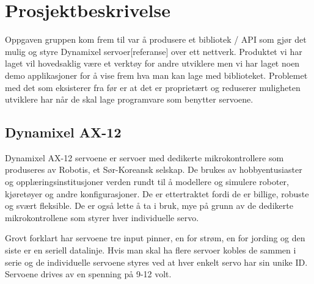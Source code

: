 \documentclass[12pt]{report}
\begin{document}
\section{Prosjektbeskrivelse}
Oppgaven gruppen kom frem til var å produsere et bibliotek / API som gjør det mulig og styre Dynamixel servoer[referanse] over ett nettverk. Produktet vi har laget vil hovedsaklig være et verktøy for andre utviklere men vi har laget noen demo applikasjoner for å vise frem hva man kan lage med biblioteket. Problemet med det som eksisterer fra før er at det er proprietært og reduserer muligheten utviklere har når de skal lage programvare som benytter servoene.

\subsection{Dynamixel AX-12}
Dynamixel AX-12 servoene er servoer med dedikerte mikrokontrollere som produseres av Robotis, et Sør-Koreansk selskap. De brukes av hobbyentusiaster og opplæringsinstitusjoner verden rundt til å modellere og simulere roboter, kjøretøyer og andre konfigurasjoner. De er ettertraktet fordi de er billige, robuste og svært fleksible. De er også lette å ta i bruk, mye på grunn av de dedikerte mikrokontrollene som styrer hver individuelle servo.

Grovt forklart har servoene tre input pinner, en for strøm, en for jording og den siste er en seriell datalinje. Hvis man skal ha flere servoer kobles de sammen i serie og de individuelle servoene styres ved at hver enkelt servo har sin unike ID. Servoene drives av en spenning på 9-12 volt.
\end{document}
